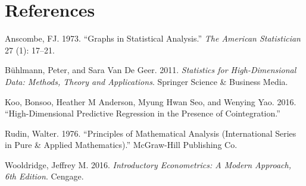\documentclass[12pt,]{article}
\begin{document}
\hypertarget{references}{%
\section*{References}\label{references}}

\hypertarget{refs}{}
\leavevmode\hypertarget{ref-ANS73}{}%
Anscombe, FJ. 1973. ``Graphs in Statistical Analysis.'' \emph{The
American Statistician} 27 (1): 17--21.

\leavevmode\hypertarget{ref-buhlmann}{}%
Bühlmann, Peter, and Sara Van De Geer. 2011. \emph{Statistics for
High-Dimensional Data: Methods, Theory and Applications}. Springer
Science \& Business Media.

\leavevmode\hypertarget{ref-koo}{}%
Koo, Bonsoo, Heather M Anderson, Myung Hwan Seo, and Wenying Yao. 2016.
``High-Dimensional Predictive Regression in the Presence of
Cointegration.''

\leavevmode\hypertarget{ref-rudin}{}%
Rudin, Walter. 1976. ``Principles of Mathematical Analysis
(International Series in Pure \& Applied Mathematics).'' McGraw-Hill
Publishing Co.

\leavevmode\hypertarget{ref-wooldridge2016}{}%
Wooldridge, Jeffrey M. 2016. \emph{Introductory Econometrics: A Modern
Approach, 6th Edition}. Cengage.
\end{document}
